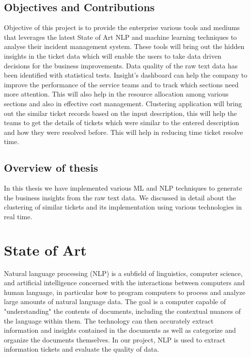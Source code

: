 \documentclass[a4paper,12pt]{report}
\begin{document}
    \section{Objectives and Contributions}
    Objective of this project is to provide the enterprise various tools and mediums that leverages the latest State of Art NLP and machine learning techniques to 
    analyse their incident management system. These tools will bring out the hidden insights in the ticket data which will enable the users to take data driven decisions for the business improvements.
    \newline\newline
    Data quality of the raw text data has been identified with statistical tests.
    Insight’s dashboard can help the company to improve the performance of the service teams and to track which sections need more attention. This will also help in the resource allocation among various sections and also in effective cost management. Clustering application will bring out the similar ticket records based on the input description, this will help the teams to get the details of tickets which were similar to the entered description and how they were resolved before. This will help in reducing time ticket resolve time.


    
    \section{Overview of thesis}
    In this thesis we have implemented various ML and NLP techniques to generate the business insights from the raw text data. We discussed in detail about the clustering of similar tickets and its implementation using various technologies in real time.

    \chapter{State of Art}
    Natural language processing (NLP)\cite{NLPWiki} is a subfield of linguistics, computer science, and artificial intelligence concerned with the interactions between computers and human language, in particular how to program computers to process and analyze large amounts of natural language data. The goal is a computer capable of "understanding" the contents of documents, including the contextual nuances of the language within them. The technology can then accurately extract information and insights contained in the documents as well as categorize and organize the documents themselves.
    In our project, NLP is used to extract information tickets and evaluate the quality of data.
\end{document}
